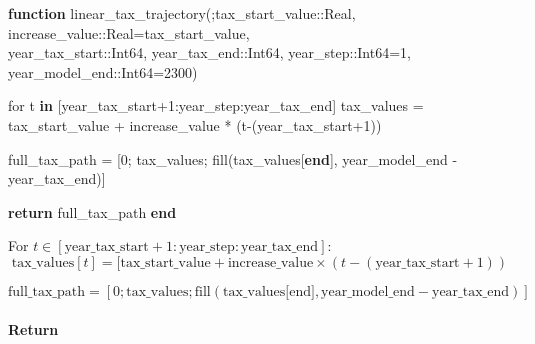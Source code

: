 \documentclass[
]{article}
\newenvironment{Shaded}{}{}
\newcommand{\ControlFlowTok}[1]{\textcolor[rgb]{0.00,0.44,0.13}{\textbf{#1}}}
\newcommand{\DataTypeTok}[1]{\textcolor[rgb]{0.56,0.13,0.00}{#1}}
\newcommand{\FloatTok}[1]{\textcolor[rgb]{0.25,0.63,0.44}{#1}}
\newcommand{\FunctionTok}[1]{\textcolor[rgb]{0.02,0.16,0.49}{#1}}
\newcommand{\KeywordTok}[1]{\textcolor[rgb]{0.00,0.44,0.13}{\textbf{#1}}}
\newcommand{\NormalTok}[1]{#1}
\newcommand{\OperatorTok}[1]{\textcolor[rgb]{0.40,0.40,0.40}{#1}}
\begin{document}
\footnotesize
\begin{mdframed}
\begin{Shaded}
\begin{Highlighting}[]
\KeywordTok{function} \FunctionTok{linear\_tax\_trajectory}\NormalTok{(;tax\_start\_value}\OperatorTok{::}\DataTypeTok{Real}\NormalTok{, increase\_value}\OperatorTok{::}\DataTypeTok{Real}\NormalTok{=tax\_start\_value,} \\
 \NormalTok{year\_tax\_start}\OperatorTok{::}\DataTypeTok{Int64}\NormalTok{, year\_tax\_end}\OperatorTok{::}\DataTypeTok{Int64}\NormalTok{, year\_step}\OperatorTok{::}\DataTypeTok{Int64}\NormalTok{=}\FloatTok{1}\NormalTok{, year\_model\_end}\OperatorTok{::}\DataTypeTok{Int64}\NormalTok{=}\FloatTok{2300}\NormalTok{)}

\NormalTok{for t }\KeywordTok{in}\NormalTok{ [year\_tax\_start}\OperatorTok{+}\FloatTok{1}\OperatorTok{:}\NormalTok{year\_step}\OperatorTok{:}\NormalTok{year\_tax\_end]}
\NormalTok{    tax\_values }\OperatorTok{=}\NormalTok{ tax\_start\_value }\OperatorTok{+}\NormalTok{ increase\_value }\OperatorTok{*}\NormalTok{ (}\FunctionTok{t{-}}\NormalTok{(year\_tax\_start}\OperatorTok{+}\FloatTok{1}\NormalTok{)) }

\NormalTok{    full\_tax\_path }\OperatorTok{=}\NormalTok{ [}\FloatTok{0}\NormalTok{; tax\_values; }\FunctionTok{fill}\NormalTok{(tax\_values[}\KeywordTok{end}\NormalTok{], year\_model\_end}\OperatorTok{{ -}}\NormalTok{ year\_tax\_end)]}

    \ControlFlowTok{return}\NormalTok{ full\_tax\_path}
\KeywordTok{end}
\end{Highlighting}
\end{Shaded}
\end{mdframed}
\normalsize

For $t \in [\text{year\_tax\_start}+1:\text{year\_step}:\text{year\_tax\_end}]$:
\begin{equation}
  \text{tax\_values}[t] = [\text{tax\_start\_value} + \text{increase\_value} \times (t - (\text{year\_tax\_start} + 1) )
\end{equation}

\begin{equation}
  \text{full\_tax\_path} = [0; \text{tax\_values}; \text{fill}(\text{tax\_values[end]}, \text{year\_model\_end} - \text{year\_tax\_end})]
\end{equation}

\paragraph{Return}\label{return-2}
\end{document}
